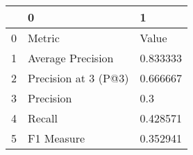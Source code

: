 \begin{tabular}{lll}
\toprule
{} &                     0 &         1 \\
\midrule
0 &                Metric &     Value \\
1 &     Average Precision &  0.833333 \\
2 &  Precision at 3 (P@3) &  0.666667 \\
3 &             Precision &       0.3 \\
4 &                Recall &  0.428571 \\
5 &            F1 Measure &  0.352941 \\
\bottomrule
\end{tabular}
